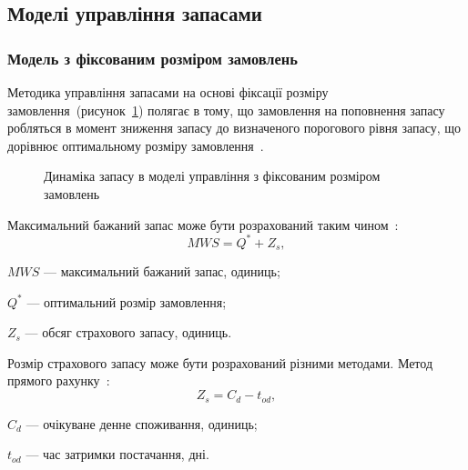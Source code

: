\subsection{Моделі управління запасами}
\subsubsection{Модель з фіксованим розміром замовлень}
Методика управління запасами на основі фіксації розміру замовлення~(рисунок~\ref{fig:model_fs:dynamic}) полягає в тому, що замовлення на поповнення запасу робляться в момент зниження запасу до визначеного порогового рівня запасу, що дорівнює оптимальному розміру замовлення~\cite{Sterligova2008}. 

\begin{figure}[H]
  \centering
{}
  \captionsetup{justification=centering}
  \caption{Динаміка запасу в моделі управління з фіксованим розміром замовлень}
  \label{fig:model_fs:dynamic}
\end{figure}

Максимальний бажаний запас може бути розрахований таким чином~\cite{Sterligova2008}:
\begin{equation} \label{eq:model_fs:mws}
MWS=Q^*+Z_s
,
\end{equation}
\begin{description}
	\item[де] $MWS$ --- максимальний бажаний запас, одиниць;
	\item $Q^*$ --- оптимальний розмір замовлення;
	\item $Z_s$ --- обсяг страхового запасу, одиниць.
\end{description}

Розмір страхового запасу може бути розрахований різними методами.
Метод прямого рахунку~\cite{Sterligova2008}:
\begin{equation} \label{eq:model_fs:zs1}
Z_s=C_d-t_{od}
,
\end{equation}
\begin{description}
	\item[де] $C_d$ --- очікуване денне споживання, одиниць;
	\item $t_{od}$ --- час затримки постачання, дні.
\end{description}

